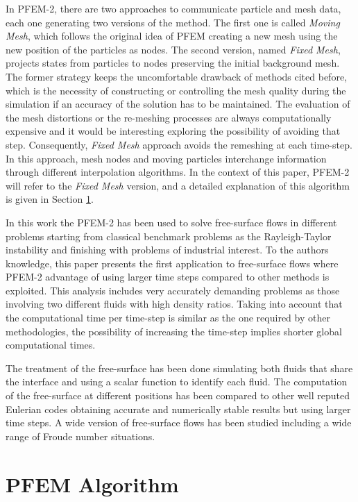 \documentclass[a4paper,conference]{IEEEtran}
\begin{document}
In PFEM-2, there are two approaches to communicate particle and mesh data, each one generating two versions of the method. The first one is called \textit{Moving Mesh}, which follows the original idea of PFEM creating a new mesh using the new position of the particles as nodes. The second version, named \textit{Fixed Mesh}, projects states from particles to nodes preserving the initial background mesh. The former strategy keeps the uncomfortable drawback of methods cited before, which is the necessity of constructing or controlling the mesh quality during the simulation if an accuracy of the solution has to be maintained. The evaluation of the mesh distortions or the re-meshing processes are always computationally expensive and it would be interesting exploring the possibility of avoiding that step. Consequently, \textit{Fixed Mesh} approach avoids the remeshing at each time-step. In this approach, mesh nodes and moving particles interchange information through different interpolation algorithms. In the context of this paper, PFEM-2 will refer to the \textit{Fixed Mesh} version, and a detailed explanation of this algorithm is given in Section \ref{PFEM_Algorithm}.

In this work the PFEM-2 has been used to solve free-surface flows in different problems starting from classical benchmark problems as the Rayleigh-Taylor instability and finishing with problems of industrial interest. To the authors knowledge, this paper presents the first application to free-surface flows where PFEM-2 advantage of using larger time steps compared to other methods is exploited. This analysis includes very accurately demanding problems as those involving two different fluids with high density ratios. Taking into account that the computational time per time-step is similar as the one required by other methodologies, the possibility of increasing the time-step implies shorter global computational times.


The treatment of the free-surface has been done simulating both fluids that share the interface and using a scalar function to identify each fluid. The computation of the free-surface at different positions has been compared to other well reputed Eulerian codes obtaining accurate and numerically stable results but using larger time steps. A wide version of free-surface flows has been studied including a wide range of Froude number situations.


\section{PFEM Algorithm}\label{PFEM_Algorithm}
\end{document}
